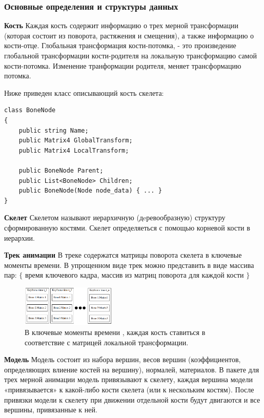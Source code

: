 \subsubsection{Основные определения и структуры данных}

\textbf{Кость}
Каждая кость содержит информацию о трех мерной трансформации (которая состоит из поворота, растяжения и смещения), а также информацию о кости-отце. Глобальная трансформация кости-потомка, - это произведение глобальной трансформации кости-родителя на локальную трансформацию самой кости-потомка. Изменение транформации родителя, меняет трансформацию потомка.

Ниже приведен класс описывающий кость скелета:
\begin{small}
\begin{verbatim}
class BoneNode
{
    public string Name;
    public Matrix4 GlobalTransform;
    public Matrix4 LocalTransform;

    public BoneNode Parent;
    public List<BoneNode> Children;
    public BoneNode(Node node_data) { ... }
}
\end{verbatim}
\end{small}

\textbf{Скелет}
Скелетом называют иерархичную (дeревообразную) структуру сформированную костями. Скелет определяеться с помощью корневой кости в иерархии.


\textbf{Трек анимации}
В треке содержатся матрицы поворота скелета в ключевые моменты времени.
В упрощенном виде трек можно представить в виде  массива пар: 
$\lbrace$ время ключевого кадра, массив из матриц поворота для каждой кости $\rbrace$

\begin{figure}[h!]
    \centering
    \includegraphics[width=0.4\textwidth]{anim_track.png}
    \caption{\small{В ключевые моменты времени , каждая кость ставиться в соответствие с матрицей локальной трансформации.}}
    
\end{figure}


\textbf{Модель}
Модель состоит из набора вершин, весов вершин (коэффициентов, определяющих влиение костей на вершину), нормалей, материалов. В пакете для трех мерной анимации модель привязывают к скелету, каждая вершина модели «привязывается» к какой-либо кости скелета (или к нескольким костям). После привязки модели к скелету при движении отдельной кости будут двигаются и все вершины, привязанные к ней.

